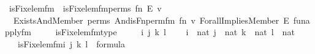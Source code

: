 \begin{isabellebody}
\isanewline
{}\isamarkupfalse%
\ is{\isacharunderscore}{\kern0pt}Fix{\isacharunderscore}{\kern0pt}elem{\isacharunderscore}{\kern0pt}fm\ \ {\isachardoublequoteopen}is{\isacharunderscore}{\kern0pt}Fix{\isacharunderscore}{\kern0pt}elem{\isacharunderscore}{\kern0pt}fm{\isacharparenleft}{\kern0pt}perms{\isacharcomma}{\kern0pt}\ fn{\isacharcomma}{\kern0pt}\ E{\isacharcomma}{\kern0pt}\ v{\isacharparenright}{\kern0pt}\ {\isasymequiv}\ \isanewline
\ \ Exists{\isacharparenleft}{\kern0pt}And{\isacharparenleft}{\kern0pt}Member{\isacharparenleft}{\kern0pt}{}{\isacharcomma}{\kern0pt}\ perms{\isacharhash}{\kern0pt}{\isacharplus}{\kern0pt}{}{\isacharparenright}{\kern0pt}{\isacharcomma}{\kern0pt}\ And{\isacharparenleft}{\kern0pt}is{\isacharunderscore}{\kern0pt}Fn{\isacharunderscore}{\kern0pt}perm{\isacharprime}{\kern0pt}{\isacharunderscore}{\kern0pt}fm{\isacharparenleft}{\kern0pt}{}{\isacharcomma}{\kern0pt}\ fn{\isacharhash}{\kern0pt}{\isacharplus}{\kern0pt}{}{\isacharcomma}{\kern0pt}\ v{\isacharhash}{\kern0pt}{\isacharplus}{\kern0pt}{}{\isacharparenright}{\kern0pt}{\isacharcomma}{\kern0pt}\ Forall{\isacharparenleft}{\kern0pt}Implies{\isacharparenleft}{\kern0pt}Member{\isacharparenleft}{\kern0pt}{}{\isacharcomma}{\kern0pt}\ E{\isacharhash}{\kern0pt}{\isacharplus}{\kern0pt}{}{\isacharparenright}{\kern0pt}{\isacharcomma}{\kern0pt}\ fun{\isacharunderscore}{\kern0pt}apply{\isacharunderscore}{\kern0pt}fm{\isacharparenleft}{\kern0pt}{}{\isacharcomma}{\kern0pt}\ {}{\isacharcomma}{\kern0pt}\ {}{\isacharparenright}{\kern0pt}{\isacharparenright}{\kern0pt}{\isacharparenright}{\kern0pt}{\isacharparenright}{\kern0pt}{\isacharparenright}{\kern0pt}{\isacharparenright}{\kern0pt}{\isachardoublequoteclose}\ \ \isanewline
\isanewline
{}\isamarkupfalse%
\ is{\isacharunderscore}{\kern0pt}Fix{\isacharunderscore}{\kern0pt}elem{\isacharunderscore}{\kern0pt}fm{\isacharunderscore}{\kern0pt}type\ {\isacharcolon}{\kern0pt}\ \isanewline
\ \ \ i\ j\ k\ l\ \isanewline
\ \ \ {\isachardoublequoteopen}i\ {\isasymin}\ nat{\isachardoublequoteclose}\ {\isachardoublequoteopen}j\ {\isasymin}\ nat{\isachardoublequoteclose}\ {\isachardoublequoteopen}k\ {\isasymin}\ nat{\isachardoublequoteclose}\ {\isachardoublequoteopen}l\ {\isasymin}\ nat{\isachardoublequoteclose}\ \isanewline
\ \ \ {\isachardoublequoteopen}is{\isacharunderscore}{\kern0pt}Fix{\isacharunderscore}{\kern0pt}elem{\isacharunderscore}{\kern0pt}fm{\isacharparenleft}{\kern0pt}i{\isacharcomma}{\kern0pt}\ j{\isacharcomma}{\kern0pt}\ k{\isacharcomma}{\kern0pt}\ l{\isacharparenright}{\kern0pt}\ {\isasymin}\ formula{\isachardoublequoteclose}\ \isanewline

\end{isabellebody}
